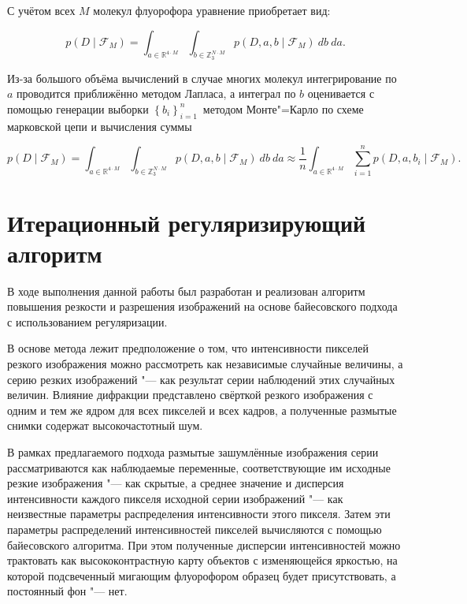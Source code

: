 С учётом всех $M$ молекул флуорофора уравнение приобретает вид:

\begin{equation*}
	p\left(D\middle|\mathcal{F}_M\right)=\int_{a\in\mathbb{R}^{4 \cdot M}}\int_{b\in\mathbb{Z}_3^{N \cdot M}}{p\left(D,a,b\middle|\mathcal{F}_M\right)\ db\ da}.
\end{equation*}	

Из-за большого объёма вычислений в случае многих молекул интегрирование по $a$ проводится приближённо методом Лапласа, а интеграл по $b$ оценивается с помощью генерации выборки $\left\{b_i\right\}_{i=1\ }^n$ методом Монте"=Карло по схеме марковской цепи и вычисления суммы

\begin{equation*}
	p\left(D\middle|\mathcal{F}_M\right)=\int_{a\in\mathbb{R}^{4 \cdot M}}\int_{b\in\mathbb{Z}_3^{N \cdot M}}{p\left(D,a,b\middle|\mathcal{F}_M\right)\ db\ da} \approx \frac{1}{n}\int_{a\in\mathbb{R}^{4 \cdot M}}{\sum_{i=1}^{n}{p\left(D,a,b_i\middle|\mathcal{F}_M\right)}}.
\end{equation*}

\section{Итерационный регуляризирующий алгоритм}

В ходе выполнения данной работы был разработан и реализован алгоритм повышения резкости и разрешения изображений на основе байесовского подхода с использованием регуляризации.

В основе метода лежит предположение о том, что интенсивности пикселей резкого изображения можно рассмотреть как независимые случайные величины, а серию резких изображений "--- как результат серии наблюдений этих случайных величин. Влияние дифракции представлено свёрткой резкого изображения с одним и тем же ядром для всех пикселей и всех кадров, а полученные размытые снимки содержат высокочастотный шум.

В рамках предлагаемого подхода размытые зашумлённые изображения серии рассматриваются как наблюдаемые переменные, соответствующие им исходные резкие изображения "--- как скрытые, а среднее значение и дисперсия интенсивности каждого пикселя исходной серии изображений "--- как неизвестные параметры распределения интенсивности этого пикселя. Затем эти параметры распределений интенсивностей пикселей вычисляются с помощью байесовского алгоритма. При этом полученные дисперсии интенсивностей можно трактовать как высококонтрастную карту объектов с изменяющейся яркостью, на которой подсвеченный мигающим флуорофором образец будет присутствовать, а постоянный фон "--- нет.


